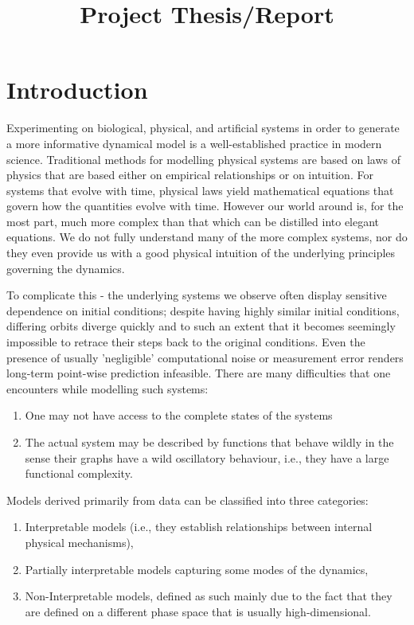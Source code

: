 \documentclass[12 pt]{article}
\begin{document}
\title{Project Thesis/Report}



\author{} 
\date{}
\date{}
\maketitle

\section{Introduction}

Experimenting on biological, physical, and artificial systems in order to generate a more informative dynamical model is a well-established practice in modern science. Traditional methods for modelling physical systems are based on laws of physics that are based either on empirical relationships or on intuition. For systems that evolve with time, physical laws yield mathematical equations that govern how the quantities evolve with time. However our world around is, for the most part, much more complex than that which can be distilled into elegant equations. We do not fully understand many of the more complex systems, nor do they even provide us with a good physical intuition of the underlying principles governing the dynamics.

To complicate this - the underlying systems we observe often display sensitive dependence on initial conditions; despite having highly similar initial conditions, differing orbits diverge quickly and to such an extent that it becomes seemingly impossible to retrace their steps back to the original conditions. Even the presence of usually 'negligible' computational noise or measurement error renders long-term point-wise prediction infeasible. 
There are many difficulties that one encounters while modelling such systems:
\vspace{-8mm}
\begin{enumerate}[noitemsep, label=\roman*.]
  \item One may not have access to the complete states of the systems
  \item The actual system may be described by functions that behave wildly in the sense their graphs have a wild oscillatory behaviour, i.e., they have a large functional complexity.    
\end{enumerate}


Models derived primarily from data can be classified into three categories: 
\vspace{-8mm}
\begin{enumerate}[noitemsep, label=\roman*.]
  \item  Interpretable models (i.e., they establish relationships between internal physical mechanisms), 
  \item Partially interpretable models capturing some modes of the dynamics, 
  \item Non-Interpretable models, defined as such mainly due to the fact that they are defined on a different phase space that is usually high-dimensional. 
\end{enumerate}
\end{document}
